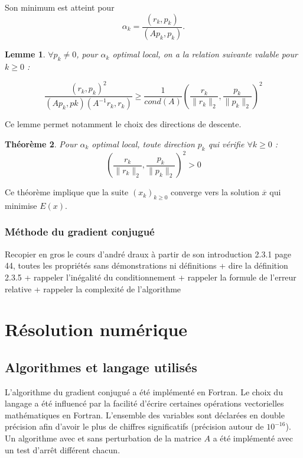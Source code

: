 \documentclass[12,french]{report}
\newtheorem{theorem}{Théorème}[chapter]
\newtheorem{lemma}[theorem]{Lemme}
\begin{document}
Son minimum est atteint pour
$$\alpha_{k}=\frac{(r_{k},p_{k})}{(Ap_{k},p_{k})}.$$



\begin{lemma}
	$\forall p_{k}\neq0$, pour $\alpha_{k}$ optimal local, on a la relation suivante valable pour $k\geq0$ :
	
$$\frac{(r_{k},p_{k})^{2}}{(Ap_{k},p{k})(A^{-1}r_{k},r_{k})}\geq\frac{1}{cond(A)}\left(\frac{r_{k}}{\|r_{k}\|_{2}},\frac{p_{k}}{\|p_{k}\|_{2}}\right)^{2}$$
\end{lemma}
Ce lemme permet notamment le choix des directions de descente.

\begin{theorem}
Pour $\alpha_{k}$ optimal local, toute direction $p_{k}$ qui vérifie $\forall k\geq0$ :
$$\left(\frac{r_{k}}{\|r_{k}\|_{2}},\frac{p_{k}}{\|p_{k}\|_{2}}\right)^{2}>0$$
\end{theorem}
Ce théorème implique que la suite $(x_{k})_{k\geq0}$ converge vers la solution $\overline{x}$ qui minimise $E(x)$.

\subsection{Méthode du gradient conjugué}

Recopier en gros le cours d'andré draux à partir de son introduction 2.3.1 page 44, 
toutes les propriétés sans démonstrations ni définitions + dire la définition 2.3.5 + rappeler l'inégalité du conditionnement + rappeler la formule de l'erreur relative + rappeler la complexité de l'algorithme





\chapter{Résolution numérique}
\section{Algorithmes et langage utilisés}

L'algorithme du gradient conjugué a été implémenté en Fortran. Le choix du langage a été influencé par la facilité d'écrire certaines opérations vectorielles mathématiques en Fortran. L'ensemble des variables sont déclarées en double précision afin d'avoir le plus de chiffres significatifs (précision autour de $10^{-16}$). Un algorithme avec et sans perturbation de la matrice $A$ a été implémenté avec un test d’arrêt différent chacun.\\
\end{document}
